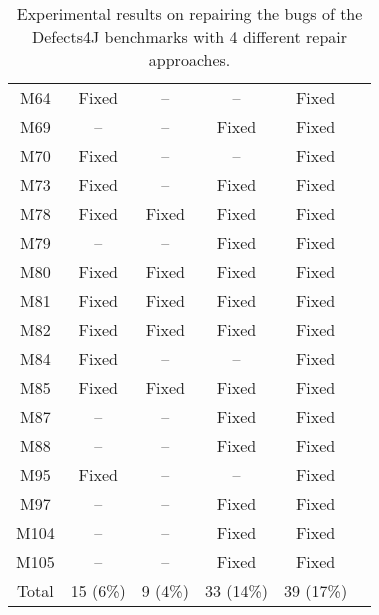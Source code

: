 \begin{table}[!t]
{\begin{tabular}{|c|c|c|c|c|c|}
M64               & Fixed     & --        & --        &Fixed   \\
M69               & --        & --        & Fixed     &Fixed   \\
M70               & Fixed     & --        & --        &Fixed   \\
M73               & Fixed     & --        & Fixed     &Fixed   \\
M78               & Fixed     & Fixed     & Fixed     &Fixed   \\
M79               & --        & --        & Fixed     &Fixed   \\
M80               & Fixed     & Fixed     & Fixed     &Fixed   \\
M81               & Fixed     & Fixed     & Fixed     &Fixed   \\
M82               & Fixed     & Fixed     & Fixed     &Fixed   \\
M84               & Fixed     & --        & --        &Fixed   \\
M85               & Fixed     & Fixed     & Fixed     &Fixed   \\
M87               & --        & --        & Fixed     &Fixed   \\
M88               & --        & --        & Fixed     &Fixed   \\
M95               & Fixed     & --        & --        &Fixed   \\
M97               & --        & --        & Fixed     &Fixed   \\
M104              & --        & --        & Fixed     &Fixed   \\
M105              & --        & --        & Fixed     &Fixed   \\
\hline
\hline
Total             & 15 (6\%)  & 9 (4\%)   & 33 (14\%) & 39 (17\%)\\
\hline 
\end{tabular}%
}
\caption{Experimental results on repairing the bugs of the Defects4J benchmarks with 4 different repair approaches.}
\end{table}
